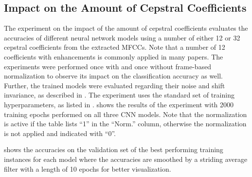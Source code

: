 
\subsection{Impact on the Amount of Cepstral Coefficients}
The experiment on the impact of the amount of cepstral coefficients evaluates the accuracies of different neural network models using a number of either 12 or 32 cepstral coefficients from the extracted MFCCs.
Note that a number of 12 coefficients with enhancements is commonly applied in many papers.
The experiments were performed once with and once without frame-based normalization to observe its impact on the classification accuracy as well.
Further, the trained models were evaluated regarding their noise and shift invariance, as described in .
The experiment uses the standard set of training hyperparameters, as listed in .
 shows the results of the experiment with 2000 training epochs performed on all three CNN models.
Note that the normalization is active if the table lists \enquote{1} in the \enquote{Norm.} column, otherwise the normalization is not applied and indicated with \enquote{0}.

 shows the accuracies on the validation set of the best performing training instances for each model where the accuracies are smoothed by a striding average filter with a length of 10 epochs for better visualization.
